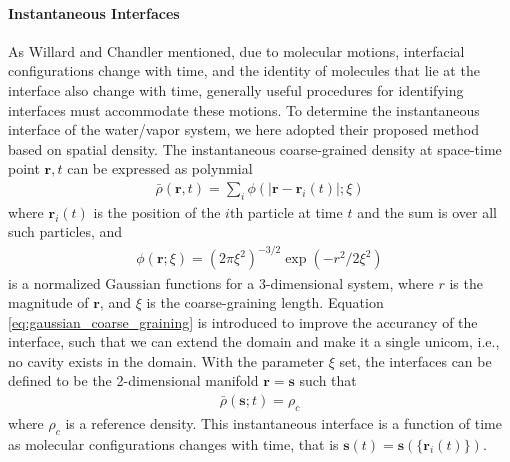 {\FloatBarrier
\paragraph{Instantaneous Interfaces}
As Willard and Chandler mentioned, due to molecular motions, interfacial configurations
change with time, and the identity of molecules that lie at the interface also change with time, generally useful procedures for
identifying interfaces must accommodate these motions. \cite{Willard2010} 
To determine the instantaneous interface of the water/vapor system, we here adopted their proposed method based on spatial density.
The instantaneous coarse-grained density at space-time point $\mathbf{r},t$ can be expressed as polynmial
\begin{eqnarray}
\bar{\rho}(\mathbf{r}, t)=\sum_{i} \phi(|\mathbf{r}-\mathbf{r}_{i}(t)|; \xi) 
\end{eqnarray}
where ${\mathbf{r}}_i(t)$ is the position of the $i$th particle at time $t$ and the sum is over all such particles, and 
\begin{eqnarray}
\phi(\mathbf{r};\xi)=(2 \pi \xi^{2})^{-3/ 2} \exp (-r^{2} / 2 \xi^{2}) 
\label{eq:gaussian_coarse_graining}
\end{eqnarray} 
is a normalized Gaussian functions for a 3-dimensional system, where $r$ is the magnitude of ${\mathbf r}$, and $\xi$ is the coarse-graining length.
Equation \ref{eq:gaussian_coarse_graining} is introduced to improve the accurancy of the interface, such that we can extend the domain and make it a single unicom,
i.e., no cavity exists in the domain.
With the parameter $\xi$ set, the interfaces can be defined to be the 2-dimensional manifold ${\mathbf r} = {\mathbf s}$ such that
\begin{eqnarray}
\bar\rho(\mathbf{s};t)= \rho_c 
\label{eq:rho_c}
\end{eqnarray} 
where $\rho_c$ is a reference density. This instantaneous interface is a function of time as molecular configurations changes with time, that is 
${\mathbf s}(t) = {\mathbf s}(\{{\mathbf r}_i(t)\})$. 

\FloatBarrier
}
